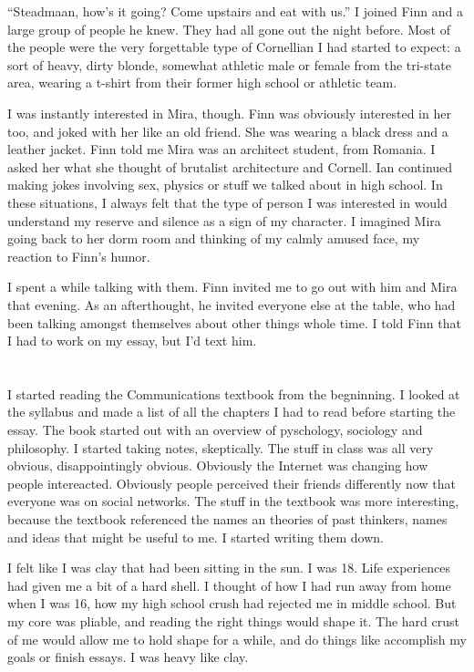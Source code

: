 ``Steadmaan, how's it going?  Come upstairs and eat with us.''  I joined Finn
and a large group of people he knew.  They had all gone out the night before.
Most of the people were the very forgettable type of Cornellian I had started to
expect: a sort of heavy, dirty blonde, somewhat athletic male or female from the
tri-state area, wearing a t-shirt from their former high school or athletic
team.

I was instantly interested in Mira, though.  Finn was obviously interested in
her too, and joked with her like an old friend.  She was wearing a black dress
and a leather jacket.  Finn told me Mira was an architect student, from Romania.
I asked her what she thought of brutalist architecture and Cornell.  Ian
continued making jokes involving sex, physics or stuff we talked about in high
school.  In these situations, I always felt that the type of person I was
interested in would understand my reserve and silence as a sign of my character.
I imagined Mira going back to her dorm room and thinking of my calmly amused
face, my reaction to Finn's humor.  

I spent a while talking with them.  Finn invited me to go out with him and Mira
that evening.  As an afterthought, he invited everyone else at the table, who
had been talking amongst themselves about other things whole time.  I told Finn
that I had to work on my essay, but I'd text him.

\section{}

I started reading the Communications textbook from the begninning.  I looked at
the syllabus and made a list of all the chapters I had to read before starting
the essay.  The book started out with an overview of pyschology, sociology and
philosophy.  I started taking notes, skeptically.  The stuff in class was all
very obvious, disappointingly obvious.  Obviously the Internet was changing how
people intereacted.  Obviously people perceived their friends differently now
that everyone was on social networks.  The stuff in the textbook was more
interesting, because the textbook referenced the names an theories of past
thinkers, names and ideas that might be useful to me.  I started writing them
down. 

I felt like I was clay that had been sitting in the sun.  I was 18.  Life
experiences had given me a bit of a hard shell.  I thought of how I had run away
from home when I was 16, how my high school crush had rejected me in middle
school.  But my core was pliable, and reading the right things would shape it.
The hard crust of me would allow me to hold shape for a while, and do things
like accomplish my goals or finish essays.  I was heavy like clay.

